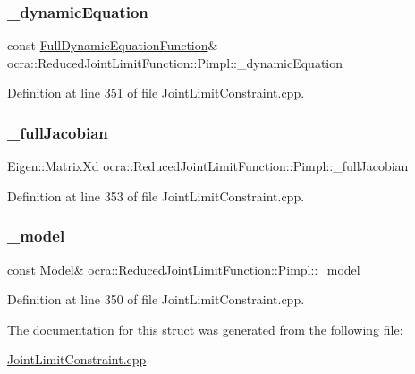 \subsubsection{\texorpdfstring{\+\_\+dynamic\+Equation}{\_dynamicEquation}}
{\footnotesize\ttfamily const \hyperlink{classocra_1_1FullDynamicEquationFunction}{Full\+Dynamic\+Equation\+Function}\& ocra\+::\+Reduced\+Joint\+Limit\+Function\+::\+Pimpl\+::\+\_\+dynamic\+Equation}



Definition at line 351 of file Joint\+Limit\+Constraint.\+cpp.

\hypertarget{structReducedJointLimitFunction_1_1Pimpl_ae45e80b72fb13b54452c6ce9fe9e3798}{}\label{structReducedJointLimitFunction_1_1Pimpl_ae45e80b72fb13b54452c6ce9fe9e3798} 
\subsubsection{\texorpdfstring{\+\_\+full\+Jacobian}{\_fullJacobian}}
{\footnotesize\ttfamily Eigen\+::\+Matrix\+Xd ocra\+::\+Reduced\+Joint\+Limit\+Function\+::\+Pimpl\+::\+\_\+full\+Jacobian}



Definition at line 353 of file Joint\+Limit\+Constraint.\+cpp.

\hypertarget{structReducedJointLimitFunction_1_1Pimpl_abe6f625fec9bf8cff9f847bde9eb9ee2}{}\label{structReducedJointLimitFunction_1_1Pimpl_abe6f625fec9bf8cff9f847bde9eb9ee2} 
\subsubsection{\texorpdfstring{\+\_\+model}{\_model}}
{\footnotesize\ttfamily const Model\& ocra\+::\+Reduced\+Joint\+Limit\+Function\+::\+Pimpl\+::\+\_\+model}



Definition at line 350 of file Joint\+Limit\+Constraint.\+cpp.



The documentation for this struct was generated from the following file\+:\begin{DoxyCompactItemize}
\item 
\hyperlink{JointLimitConstraint_8cpp}{Joint\+Limit\+Constraint.\+cpp}\end{DoxyCompactItemize}

